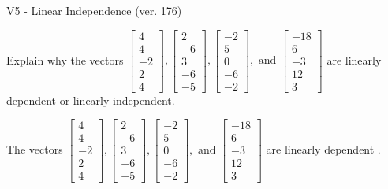 \begin{exercise}
  \begin{exerciseTitle}V5 - Linear Independence (ver. 176)\end{exerciseTitle}
  \begin{exerciseStatement}
    Explain why the vectors \(\left[\begin{array}{r}
4 \\
4 \\
-2 \\
2 \\
4
\end{array}\right] , \left[\begin{array}{r}
2 \\
-6 \\
3 \\
-6 \\
-5
\end{array}\right] , \left[\begin{array}{r}
-2 \\
5 \\
0 \\
-6 \\
-2
\end{array}\right] , \text{ and } \left[\begin{array}{r}
-18 \\
6 \\
-3 \\
12 \\
3
\end{array}\right]\) are linearly dependent or linearly independent.	


  \end{exerciseStatement}
  \begin{exerciseAnswer}
   The vectors \(\left[\begin{array}{r}
4 \\
4 \\
-2 \\
2 \\
4
\end{array}\right] , \left[\begin{array}{r}
2 \\
-6 \\
3 \\
-6 \\
-5
\end{array}\right] , \left[\begin{array}{r}
-2 \\
5 \\
0 \\
-6 \\
-2
\end{array}\right] , \text{ and } \left[\begin{array}{r}
-18 \\
6 \\
-3 \\
12 \\
3
\end{array}\right]\) are 
  	 linearly dependent  .
  


  \end{exerciseAnswer}
\end{exercise}